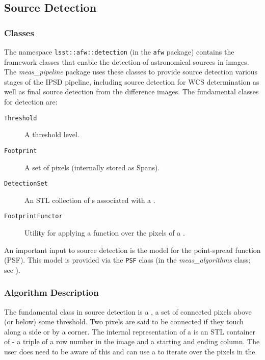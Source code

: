 
\subsection{Source Detection}
\label{secDetection}

\subsubsection{Classes}

The namespace {\tt lsst::afw::detection} (in the {\tt afw} package)
contains the framework classes that enable the detection of
astronomical sources in images.  The {\it meas\_pipeline} package uses
these classes to provide source detection various stages of the IPSD
pipeline, including source detection for WCS determination as well as
final source detection from the difference images.  The fundamental
classes for detection are: 

\begin{description}
    \item[{\tt Threshold}] A threshold level.
    \item[{\tt Footprint}] A set of pixels (internally stored as Spans).
    \item[{\tt DetectionSet}] An STL collection of s associated 
        with a .
    \item[{\tt FootprintFunctor}] Utility for applying a function over the pixels of
        a .
\end{description}

An important input to source detection is the model for the
point-spread function (PSF).  This model is provided via the {\tt PSF}
class (in the {\it meas\_algorithms} class; see ). 

\subsubsection{Algorithm Description}

The fundamental class in source detection is a , a set of 
connected pixels above (or below) some threshold. Two pixels are said to be 
connected if they touch along a side or by a corner. The internal 
representation of a  is an STL container of  - 
a triple of a row number in the image and a starting and ending column. The 
user does need to be aware of this and can use a  to
iterate over the pixels in the 

